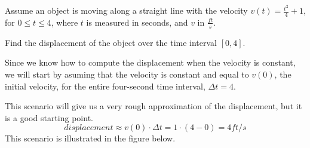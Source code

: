 \documentclass{ximera}
\begin{document}
\begin{example}
Assume an object is moving along a straight line  with the velocity $v(t)=\frac{t^2}{4}+1$, for $0\le t\le4$, where $t$ is measured in seconds, and $v$ in $\frac{ft}{s}$.

  Find the displacement of the object over the time interval $[0,4]$. 
  \begin{explanation}
   Since we know how to compute the displacement when the velocity is constant, we will start by asuming that the velocity is constant and equal to $v(0)$, the initial velocity, for the entire  four-second time interval, $\Delta t=4$. 
   
   This scenario will give us a very rough approximation of the displacement, but it is a good starting point.
  \[
   displacement\approx v(0)\cdot\Delta t=1\cdot(4-0)=4 ft/s
  \]
This scenario is illustrated in the figure below.
 \begin{image}
\end{image}
\end{explanation}
\end{example}
\end{document}

